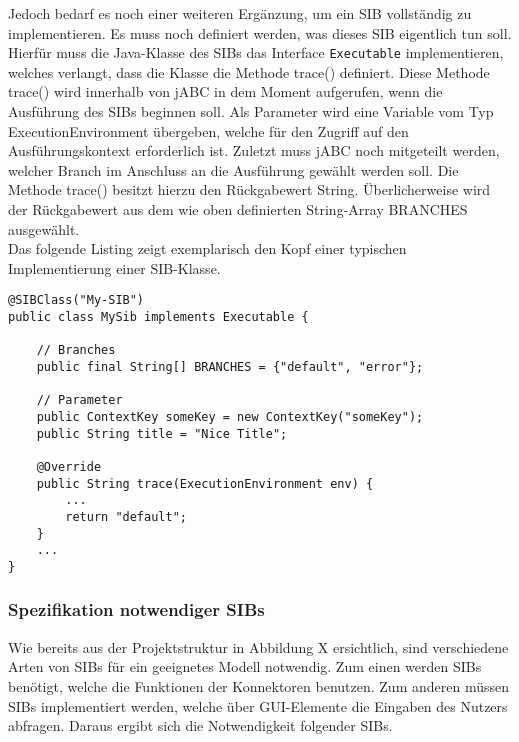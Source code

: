 Jedoch bedarf es noch einer weiteren Ergänzung, um ein SIB vollständig zu implementieren. Es muss noch definiert werden, was dieses SIB eigentlich tun soll. Hierfür muss die Java-Klasse des SIBs das Interface \texttt{Executable} implementieren, welches verlangt, dass die Klasse die Methode trace() definiert. Diese Methode trace() wird innerhalb von jABC in dem Moment aufgerufen, wenn die Ausführung des SIBs beginnen soll. Als Parameter wird eine Variable vom Typ ExecutionEnvironment übergeben, welche für den Zugriff auf den Ausführungskontext erforderlich ist. Zuletzt muss jABC noch mitgeteilt werden, welcher Branch im Anschluss an die Ausführung gewählt werden soll. Die Methode trace() besitzt hierzu den Rückgabewert String. Überlicherweise wird der Rückgabewert aus dem wie oben definierten String-Array BRANCHES ausgewählt.\\

Das folgende Listing zeigt exemplarisch den Kopf einer typischen Implementierung einer SIB-Klasse.

\begin{lstlisting}
@SIBClass("My-SIB")
public class MySib implements Executable {

	// Branches
    public final String[] BRANCHES = {"default", "error"};

    // Parameter
    public ContextKey someKey = new ContextKey("someKey");
    public String title = "Nice Title";

    @Override
    public String trace(ExecutionEnvironment env) {
        ...
		return "default";
    }
	...
}
\end{lstlisting}


\subsubsection{Spezifikation notwendiger SIBs}
Wie bereits aus der Projektstruktur in Abbildung X ersichtlich, sind verschiedene Arten von SIBs für ein geeignetes Modell notwendig. Zum einen werden SIBs benötigt, welche die Funktionen der Konnektoren benutzen. Zum anderen müssen SIBs implementiert werden, welche über GUI-Elemente die Eingaben des Nutzers abfragen. Daraus ergibt sich die Notwendigkeit folgender SIBs.\\

